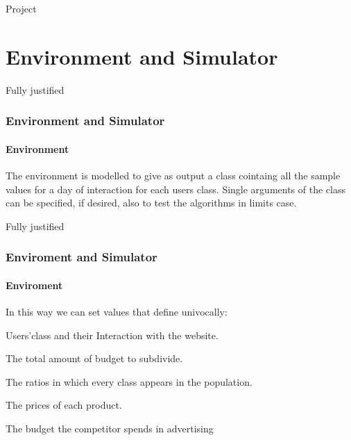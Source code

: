 \documentclass{beamer}
\begin{document}
\frame{\titlepage}

\begin{frame}{Project}
    \tableofcontents[hideallsubsections]
\end{frame}


\AtBeginSection[]
{
\begin{frame}{}
    \tableofcontents[currentsection]
\end{frame}
}


\section{Environment and Simulator}

\begin{frame}{Fully justified}

\frametitle{Environment and Simulator}
\framesubtitle{Environment}
The environment is modelled to give as output a class cointaing all the sample values for a day of interaction for each users class.
Single arguments of the class can be specified, if desired, also to test the algorithms in limits case.

\end {frame}


\begin{frame}{Fully justified}

\frametitle{Enviroment and Simulator}
\framesubtitle{Enviroment}
In this way we can set values that define univocally:
\vspace{0.5cm}
\begin{list}{-}{\setlength{\itemsep}{0.5cm}}
    \item Users'class and their Interaction with the website.
    \item The total amount of budget to subdivide.
    \item The ratios in which every class appears in the population.
    \item The prices of each product.
    \item The budget the competitor spends in advertising
\end{list}

\end {frame}
\end{document}

